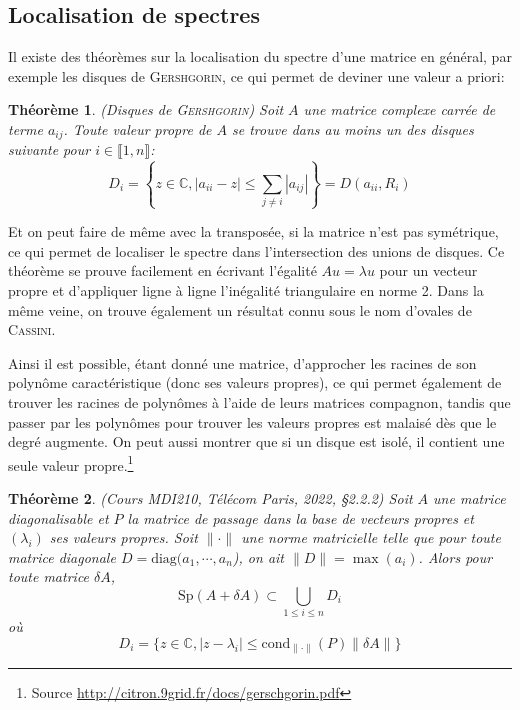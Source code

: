 \documentclass[svgnames,dvipsnames,a4paper,10pt,french]{report}
\newtheorem{theorem}{Théorème}[section]
\begin{document}
\begin{appendices}
\section{Localisation de spectres}


Il existe  des théorèmes sur la localisation du spectre d'une matrice en général, par exemple les disques de \textsc{Gershgorin}, ce qui permet de \og deviner \fg{} une valeur a priori:

\begin{theorem}{(Disques de \textsc{Gershgorin})}
Soit $A$ une matrice complexe carrée de terme $a_{ij}$. Toute valeur propre de $A$ se trouve dans au moins un des disques suivante pour $i\in\llbracket 1,n \rrbracket$:
\begin{equation}
    D_i=\left\{z\in \mathbb{C}, |a_{ii}-z|\leq \sum_{j\neq i}|a_{ij}| \right\}=D(a_{ii},R_i)
\end{equation}
\end{theorem}

Et on peut faire de même avec la transposée, si la matrice n'est pas symétrique, ce qui permet de localiser le spectre dans l'intersection des unions de disques. Ce théorème se prouve facilement en écrivant l'égalité $Au = \lambda u$ pour un vecteur propre et d'appliquer  ligne à ligne l'inégalité triangulaire en norme 2. Dans la même veine, on trouve également un résultat connu sous le nom d'ovales de \textsc{Cassini}. 

Ainsi il est possible, étant donné une matrice, d'approcher les racines de son polynôme caractéristique (donc ses valeurs propres), ce qui permet également de trouver les racines de polynômes à l'aide de leurs matrices compagnon, tandis que passer par les polynômes pour trouver les valeurs propres est malaisé dès que le degré augmente. On peut aussi montrer que si un disque est isolé, il contient une seule valeur propre.\footnote{Source \url{http://citron.9grid.fr/docs/gerschgorin.pdf}}



\begin{theorem}{(Cours MDI210, Télécom Paris, 2022, \S 2.2.2)}
Soit $A$ une matrice diagonalisable et $P$ la matrice de passage dans la base de vecteurs propres et $(\lambda_i)$ ses valeurs propres. Soit $\| \cdot \|$ une norme matricielle telle que pour toute matrice diagonale $D = \text{diag}(a_1, \cdots, a_n$), on ait $\|D\| = \max (a_i)$. Alors pour toute matrice $\delta A$,
\begin{equation}
    \text{Sp}(A + \delta A) \subset \bigcup_{1\le i \le n} D_i
\end{equation}
où
\begin{equation}
    D_i = \{ z\in\mathbb{C}, |z-\lambda_i| \le \text{cond}_{\| \cdot \|} (P) \| \delta A\| \}
\end{equation}
\end{theorem}


\end{appendices}
\end{document}
